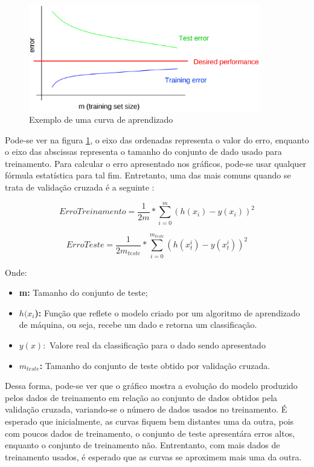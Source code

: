 \begin{figure}[h]
  \centering
  \includegraphics[width=0.9\textwidth]{figuras/curva_aprendizado.eps}
  \caption{Exemplo de uma curva de aprendizado \cite{1_ng} }
  \label{fig:curva_aprendizado}
\end{figure}

Pode-se ver na figura \ref{fig:curva_aprendizado}, o eixo das ordenadas representa
o valor do erro, enquanto o eixo das abscissas representa o tamanho do conjunto de
dado usado para treinamento. Para calcular o erro apresentado nos gráficos, pode-se
usar qualquer fórmula estatística para tal fim. Entretanto, uma das mais comuns
quando se trata de validação cruzada é a seguinte \cite{1_ng}:

\begin{equation}
ErroTreinamento = \frac{1}{2m}*\sum_{i=0}^{m}(h(x_{i}) - y(x_{i}))^2
\end{equation}

\begin{equation}
ErroTeste = \frac{1}{2m_{teste}}*\sum_{i=0}^{m_{teste}}(h(x_{t}^{i}) - y(x_{t}^{i}))^2
\end{equation}

Onde:

\begin{itemize}
    \item \textbf{m: } Tamanho do conjunto de teste;
    \item \textbf{$h(x_{i}$): } Função que reflete o modelo criado por um algoritmo
    de aprendizado de máquina, ou seja, recebe um dado e retorna um classificação.
    \item \textbf{$y(x): $} Valore real da classificação para o dado sendo apresentado
    \item \textbf{$m_{teste}$: } Tamanho do conjunto de teste obtido por validação cruzada.
\end{itemize}

Dessa forma, pode-se ver que o gráfico mostra a evolução do modelo produzido pelos
dados de treinamento em relação ao conjunto de dados obtidos pela validação cruzada,
variando-se o número de dados usados no treinamento. É esperado que inicialmente, as
curvas fiquem bem distantes uma da outra, pois com poucos dados de treinamento, o
conjunto de teste apresentára erros altos, enquanto o conjunto de treinamento não.
Entrentanto, com mais dados de treinamento usados, é esperado que as curvas se
aproximem mais uma da outra.

